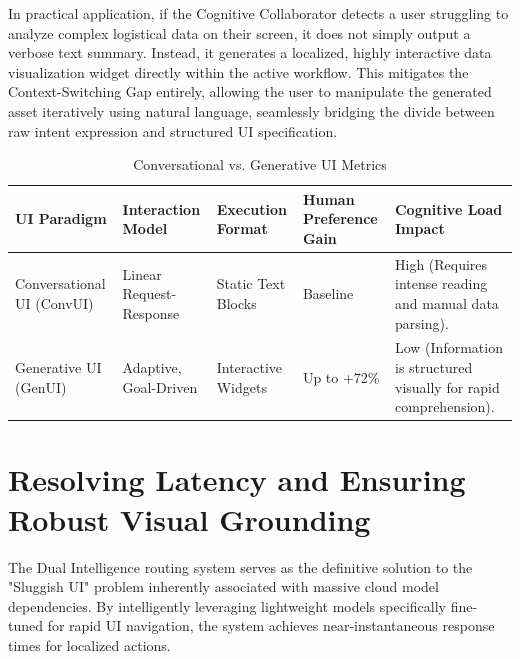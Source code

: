 \documentclass[12pt, a4paper]{report}
\begin{document}
In practical application, if the Cognitive Collaborator detects a user struggling to analyze complex logistical data on their screen, it does not simply output a verbose text summary. Instead, it generates a localized, highly interactive data visualization widget directly within the active workflow.\cite{hojo2025} This mitigates the Context-Switching Gap entirely, allowing the user to manipulate the generated asset iteratively using natural language, seamlessly bridging the divide between raw intent expression and structured UI specification.\cite{hojo2025}

\begin{table}[H]
    \centering
    \small
    \caption{Conversational vs. Generative UI Metrics}
    \label{tab:ui_metrics}
    \begin{tabularx}{\textwidth}{>{\raggedright\arraybackslash}X >{\raggedright\arraybackslash}X >{\raggedright\arraybackslash}X >{\raggedright\arraybackslash}X >{\raggedright\arraybackslash}X}
    \toprule
    \textbf{UI Paradigm} & \textbf{Interaction Model} & \textbf{Execution Format} & \textbf{Human Preference Gain} & \textbf{Cognitive Load Impact} \\
    \midrule
    Conversational UI (ConvUI) & Linear Request-Response & Static Text Blocks & Baseline & High (Requires intense reading and manual data parsing).\cite{arxiv2508} \\
    \midrule
    Generative UI (GenUI) & Adaptive, Goal-Driven & Interactive Widgets & Up to +72\%\cite{arxiv2508} & Low (Information is structured visually for rapid comprehension).\cite{arxiv2508v2} \\
    \bottomrule
    \end{tabularx}
\end{table}

\section{Resolving Latency and Ensuring Robust Visual Grounding}
The Dual Intelligence routing system serves as the definitive solution to the "Sluggish UI" problem inherently associated with massive cloud model dependencies.\cite{hojo2025} By intelligently leveraging lightweight models specifically fine-tuned for rapid UI navigation, the system achieves near-instantaneous response times for localized actions.\cite{hojo2025}
\end{document}
